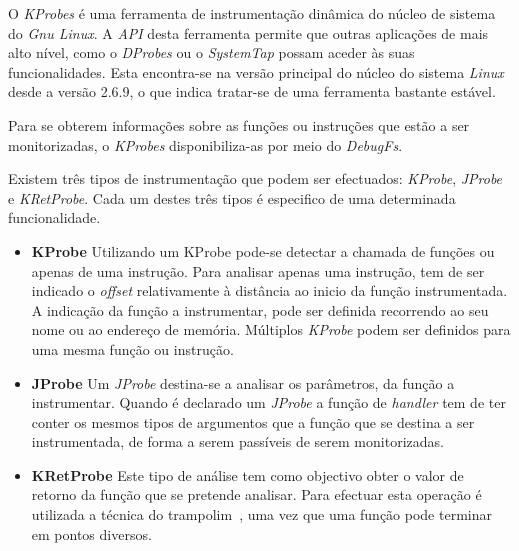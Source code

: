 O \textit{KProbes} é uma ferramenta de instrumentação dinâmica do núcleo de sistema do \textit{Gnu Linux}.
A \textit{API} desta ferramenta permite que outras aplicações de mais alto nível, como o \textit{DProbes} ou o \textit{SystemTap} possam aceder às suas funcionalidades.
Esta encontra-se na versão principal do núcleo do sistema \textit{Linux} desde a versão 2.6.9, o que indica tratar-se de uma ferramenta bastante estável\cite{kernel_debug_printk_on_fly,KProbesSite}.


Para se obterem informações sobre as funções ou instruções que estão a ser monitorizadas, o \textit{KProbes} disponibiliza-as por meio do \textit{DebugFs}.

Existem três tipos de instrumentação que podem ser efectuados: \textit{KProbe}, \textit{JProbe} e \textit{KRetProbe}.
Cada um destes três tipos é especifico de uma determinada funcionalidade.

\begin{itemize}
 \item \textbf{KProbe}
Utilizando um KProbe pode-se detectar a chamada de funções ou apenas de uma instrução.
Para analisar apenas uma instrução, tem de ser indicado o \textit{offset} relativamente à distância ao inicio da função instrumentada.
A indicação da função a instrumentar, pode ser definida recorrendo ao seu nome ou ao endereço de memória.
Múltiplos \textit{KProbe} podem ser definidos para uma mesma função ou instrução.

\item \textbf{JProbe}
Um \textit{JProbe} destina-se a analisar os parâmetros, da função a instrumentar.
Quando é declarado um \textit{JProbe} a função de \textit{handler} tem de ter conter os mesmos tipos de argumentos que a função que se destina a ser instrumentada, de forma a serem passíveis de serem monitorizadas.
 

 \item \textbf{KRetProbe}
Este tipo de análise tem como objectivo obter o valor de retorno da função que se pretende analisar.
Para efectuar esta operação é utilizada a técnica do trampolim~\cite{Hollingsworth94dynamicprogram}, uma vez que uma função pode terminar em pontos diversos.


\end{itemize}

